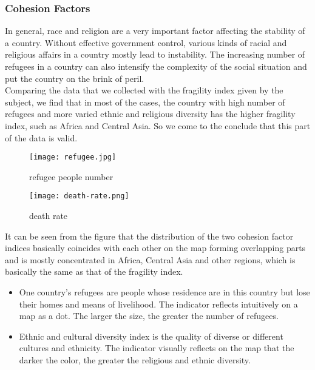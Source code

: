 \documentclass{mcmthesis}
\begin{document}
\subsubsection{Cohesion Factors}
In general, race and religion are a very important factor affecting the stability of a country. Without effective government control, various kinds of racial and religious affairs in a country mostly lead to instability. The increasing number of refugees in a country can also intensify the complexity of the social situation and put the country on the brink of peril.\\
Comparing the data that we collected with the fragility index given by the subject, we find that in most of the cases, the country with high number of refugees and more varied ethnic and religious diversity has the higher fragility index, such as Africa and Central Asia. So we come to the conclude that this part of the data is valid.\\
\begin{figure}[h]
  \centering
  \begin{minipage}[h]{0.48\textwidth}
  \centering
  \texttt{[image: refugee.jpg]}
  \caption{refugee people number}
  \end{minipage}
  \begin{minipage}[h]{0.48\textwidth}
  \centering
  \texttt{[image: death-rate.png]}
  \caption{death rate}
  \end{minipage}
\end{figure}
\newpage
It can be seen from the figure that the distribution of the two cohesion factor indices basically coincides with each other on the map forming overlapping parts and is mostly concentrated in Africa, Central Asia and other regions, which is basically the same as that of the fragility index.
\begin{itemize}
  \item One country's refugees are people whose residence are in this country but lose their homes and means of livelihood. The indicator reflects intuitively on a map as a dot. The larger the size, the greater the number of refugees.
  \item Ethnic and cultural diversity index is the quality of diverse or different cultures and ethnicity. The indicator visually reflects on the map that the darker the color, the greater the religious and ethnic diversity.
\end{itemize}
\end{document}
